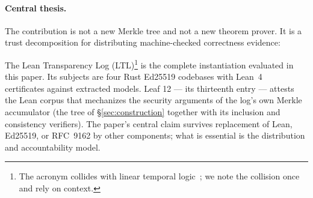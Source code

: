 \documentclass[11pt]{article}
\theoremstyle{remark}
\begin{document}
\paragraph{Central thesis.}
The contribution is not a new Merkle tree and not a new theorem prover. It is a
trust decomposition for distributing machine-checked correctness evidence:

\begin{center}
\end{center}

The Lean Transparency Log (LTL)\footnote{The acronym collides with linear
temporal logic~\cite{pnueli}; we note the collision once and rely on context.}
is the complete instantiation evaluated in this paper. Its subjects are four
Rust Ed25519 codebases with Lean~4~\cite{lean4} certificates against extracted
models. Leaf 12 --- its thirteenth entry --- attests the Lean corpus
that mechanizes the security arguments of the log's own Merkle accumulator
(the tree of \S\ref{sec:construction} together with its inclusion and
consistency verifiers). The paper's central
claim survives replacement of Lean, Ed25519, or RFC~9162 by other components;
what is essential is the distribution and accountability model.
\end{document}
